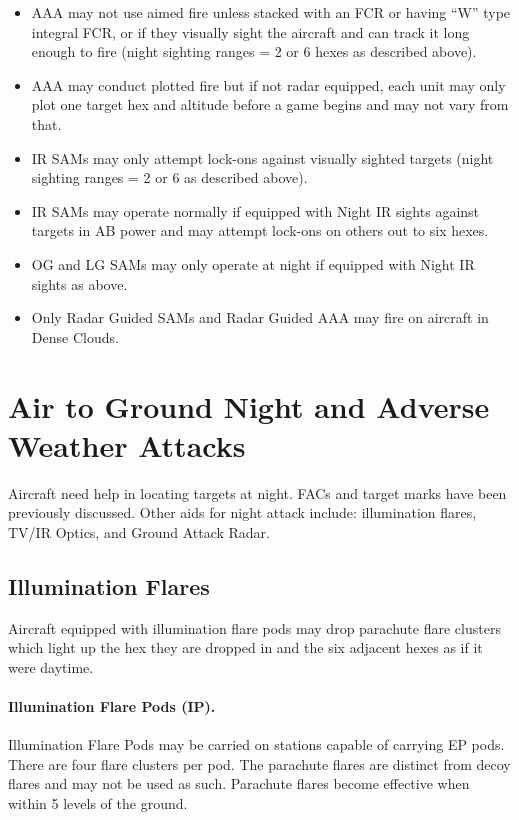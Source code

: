 \begin{advancedrules}
\begin{itemize}
    \item AAA may not use aimed fire unless stacked with an FCR or having “W” type integral FCR, or if they visually sight the aircraft and can track it long enough to fire (night sighting ranges = 2 or 6 hexes as described above).

    \item AAA may conduct plotted fire but if not radar equipped, each unit may only plot one target hex and altitude before a game begins and may not vary from that.

    \item IR SAMs may only attempt lock-ons against visually sighted targets (night sighting ranges = 2 or 6 as described above).

    \item IR SAMs may operate normally if equipped with Night IR sights against targets in AB power and may attempt lock-ons on others out to six hexes.

    \item OG and LG SAMs may only operate at night if equipped with Night IR sights as above.

    \item Only Radar Guided SAMs and Radar Guided AAA may fire on aircraft in Dense Clouds.

\end{itemize}

\section{Air to Ground Night and Adverse Weather Attacks}

Aircraft need help in locating targets at night. FACs and target marks have been previously discussed. Other aids for night attack include: illumination flares, TV/IR Optics, and Ground Attack Radar.

\subsection{Illumination Flares}

Aircraft equipped with illumination flare pods may drop parachute flare clusters which light up the hex they are dropped in and the six adjacent hexes as if it were daytime.

\paragraph{Illumination Flare Pods (IP).} Illumination Flare Pods may be carried on stations capable of carrying EP pods. There are four flare clusters per pod. The parachute flares are distinct from decoy flares and may not be used as such. Parachute flares become effective when within 5 levels of the ground.


\end{advancedrules}
